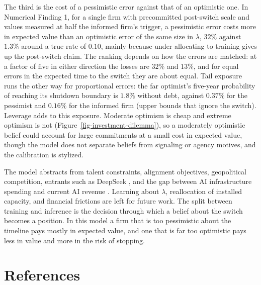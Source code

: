 \documentclass[
  11pt,
  letterpaper,
]{scrartcl}
\begin{document}
The third is the cost of a pessimistic error against that of an
optimistic one. In Numerical Finding 1, for a single firm with
precommitted post-switch scale and values measured at half the informed
firm's trigger, a pessimistic error costs more in expected value than an
optimistic error of the same size in \(\lambda\), \(32\%\) against
\(1.3\%\) around a true rate of \(0.10\), mainly because
under-allocating to training gives up the post-switch claim. The ranking
depends on how the errors are matched: at a factor of five in either
direction the losses are \(32\%\) and \(13\%\), and for equal errors in
the expected time to the switch they are about equal. Tail exposure runs
the other way for proportional errors: the far optimist's five-year
probability of reaching its shutdown boundary is \(1.8\%\) without debt,
against \(0.37\%\) for the pessimist and \(0.16\%\) for the informed
firm (upper bounds that ignore the switch). Leverage adds to this
exposure. Moderate optimism is cheap and extreme optimism is not
(Figure~\ref{fig-investment-dilemma}), so a moderately optimistic belief
could account for large commitments at a small cost in expected value,
though the model does not separate beliefs from signaling or agency
motives, and the calibration is stylized.

The model abstracts from talent constraints, alignment objectives,
geopolitical competition, entrants such as DeepSeek
\citep{deepseek2025r1}, and the gap between AI infrastructure spending
and current AI revenue \citep{cahn2024gap}. Learning about \(\lambda\),
reallocation of installed capacity, and financial frictions are left for
future work. The split between training and inference is the decision
through which a belief about the switch becomes a position. In this
model a firm that is too pessimistic about the timeline pays mostly in
expected value, and one that is far too optimistic pays less in value
and more in the risk of stopping.

\newpage
\clearpage

\section*{References}\label{references}

\begingroup
\raggedright

\renewcommand{\bibsection}{}


\endgroup
\end{document}

